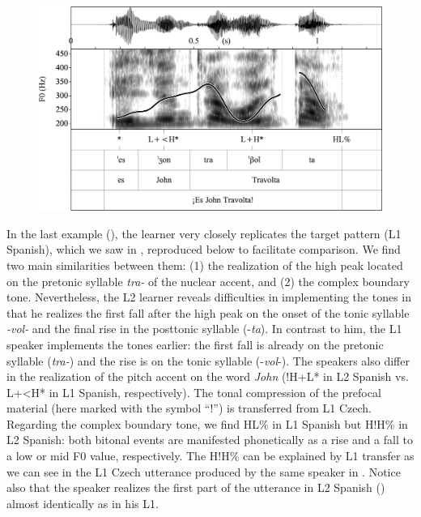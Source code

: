 \begin{figure}


\includegraphics[width=\textwidth]{figures/Figure_4.26.png}


\end{figure}

In the last example (), the learner very closely replicates the target pattern (L1 Spanish), which we saw in , reproduced below to facilitate comparison.
We find two main similarities between them: (1) the realization of the high peak located on the pretonic syllable \textit{tra-} of the nuclear accent, and (2) the complex boundary tone. Nevertheless, the L2 learner reveals difficulties in implementing the tones in that he realizes the first fall after the high peak on the onset of the tonic syllable \textit{{}-vol-} and the final rise in the posttonic syllable (-\textit{ta}). In contrast to him, the L1 speaker implements the tones earlier: the first fall is already on the pretonic syllable (\textit{tra-}) and the rise is on the tonic syllable (-\textit{vol}{}-). The speakers also differ in the realization of the pitch accent on the word \textit{John} (!H+L* in L2 Spanish vs. L+<H* in L1 Spanish, respectively). The tonal compression of the prefocal material (here marked with the symbol “!”) is transferred from L1 Czech. Regarding the complex boundary tone, we find HL\% in L1 Spanish but H!H\% in L2 Spanish: both bitonal events are manifested phonetically as a rise and a fall to a low or mid F0 value, respectively. The H!H\% can be explained by L1 transfer as we can see in the L1 Czech utterance produced by the same speaker in . Notice also that the speaker realizes the first part of the utterance in L2 Spanish () almost identically as in his L1.

